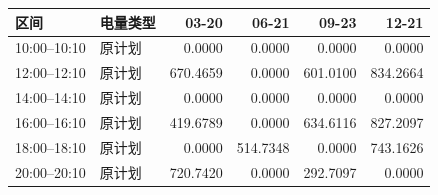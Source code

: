 \begin{tabular}{llrrrr}
\toprule
区间 & 电量类型 & 03-20 & 06-21 & 09-23 & 12-21 \\
\midrule
10:00--10:10 & 原计划 & 0.0000 & 0.0000 & 0.0000 & 0.0000 \\
12:00--12:10 & 原计划 & 670.4659 & 0.0000 & 601.0100 & 834.2664 \\
14:00--14:10 & 原计划 & 0.0000 & 0.0000 & 0.0000 & 0.0000 \\
16:00--16:10 & 原计划 & 419.6789 & 0.0000 & 634.6116 & 827.2097 \\
18:00--18:10 & 原计划 & 0.0000 & 514.7348 & 0.0000 & 743.1626 \\
20:00--20:10 & 原计划 & 720.7420 & 0.0000 & 292.7097 & 0.0000 \\
\bottomrule
\end{tabular}
